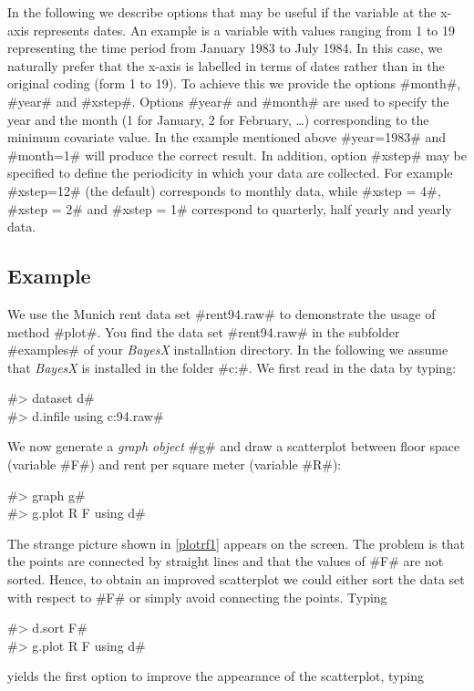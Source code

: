 In the following we describe options that may be useful if the
variable at the x-axis represents dates. An example is a variable
with values ranging from 1 to 19 representing the time period from
January 1983 to July 1984. In this case, we naturally prefer that
the x-axis is labelled in terms of dates rather than in the
original coding (form 1 to 19). To achieve this we provide the
options #month#, #year# and #xstep#. Options #year# and #month#
are used to specify the year and the month (1 for January, 2 for
February, \dots) corresponding to the minimum covariate value. In
the example mentioned above #year=1983# and #month=1# will produce the
correct result. In addition, option #xstep# may be specified to
define the periodicity in which your data are collected. For
example #xstep=12# (the default) corresponds to monthly data,
while #xstep = 4#, #xstep = 2# and #xstep = 1# correspond to
quarterly, half yearly and yearly data.


\subsection*{Example}

We use the Munich rent data set #rent94.raw# to demonstrate the
usage of method #plot#. You find the data set #rent94.raw# in the
subfolder #examples# of your {\em BayesX} installation directory.
In the following we assume that {\em BayesX} is installed in the
folder #c:\bayesx#.
We first read in the data by typing:

#> dataset d# \\
#> d.infile using c:\bayesx\examples\rent94.raw#

We now generate a {\em graph object} #g# and draw a scatterplot
between floor space (variable #F#)
and rent per square meter (variable #R#):

#> graph g# \\
#> g.plot R F using d#

The strange picture shown in \autoref{plotrf1} appears on the
screen. The problem is that the points are connected by straight
lines and that the values of #F# are not sorted. Hence, to obtain
an improved scatterplot we could either sort the data set with
respect to #F# or simply avoid connecting the points.
Typing

#> d.sort F# \\
#> g.plot R F using d#

yields the first option to improve the appearance of the scatterplot, typing


